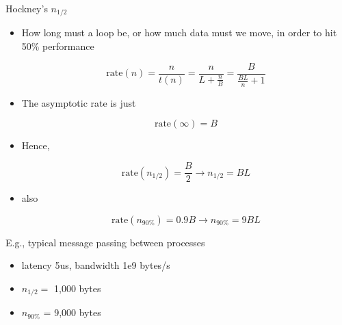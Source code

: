 \begin{frame}{Hockney's $n_{1/2}$}
  \begin{itemize}
  \item How long must a loop be, or how much data must we move, in order to hit 50\% performance

\[
  \mbox{rate}(n) = \frac{n}{t(n)} = \frac{n}{L + \frac{n}{B}} = \frac{B}{\frac{B L}{n} + 1}
\]  

  \item The asymptotic rate is just

\[
   \mbox{rate}(\infty) = B
\]

  \item Hence, 

\[
   \mbox{rate}(n_{1/2}) = \frac{B}{2} \rightarrow n_{1/2} = B L
\]

  \item also

\[
   \mbox{rate}(n_{90\%}) = 0.9 B \rightarrow n_{90\%} = 9 B L
\]

  \end{itemize}
  
\end{frame}


\begin{frame}{E.g., typical message passing between processes}

    \begin{itemize}
    \item latency 5us, bandwidth 1e9 bytes/s
    \item $n_{1/2} =$ 1,000 bytes
    \item $n_{90\%}$ = 9,000 bytes
    \end{itemize}

\end{frame}

